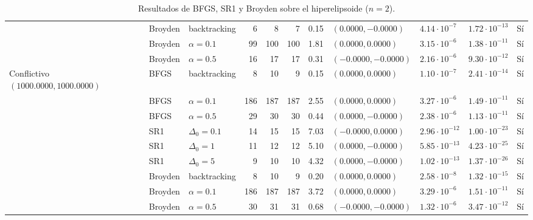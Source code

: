 \begin{table}[htbp]
{\begin{tabular}{lllrrrrlllc}
 & Broyden & backtracking & 6 & 8 & 7 & 0.15 & $(0.0000, -0.0000)$ & $4.14\cdot 10^{-7}$ & $1.72\cdot 10^{-13}$ & Sí \\
 & Broyden & $\alpha = 0.1$ & 99 & 100 & 100 & 1.81 & $(0.0000, 0.0000)$ & $3.15\cdot 10^{-6}$ & $1.38\cdot 10^{-11}$ & Sí \\
 & Broyden & $\alpha = 0.5$ & 16 & 17 & 17 & 0.31 & $(-0.0000, -0.0000)$ & $2.16\cdot 10^{-6}$ & $9.30\cdot 10^{-12}$ & Sí \\
\midrule
Conflictivo $(1000.0000, 1000.0000)$ & BFGS & backtracking & 8 & 10 & 9 & 0.15 & $(0.0000, 0.0000)$ & $1.10\cdot 10^{-7}$ & $2.41\cdot 10^{-14}$ & Sí \\
 & BFGS & $\alpha = 0.1$ & 186 & 187 & 187 & 2.55 & $(0.0000, 0.0000)$ & $3.27\cdot 10^{-6}$ & $1.49\cdot 10^{-11}$ & Sí \\
 & BFGS & $\alpha = 0.5$ & 29 & 30 & 30 & 0.44 & $(0.0000, -0.0000)$ & $2.38\cdot 10^{-6}$ & $1.13\cdot 10^{-11}$ & Sí \\
 & SR1 & $\Delta_0 = 0.1$ & 14 & 15 & 15 & 7.03 & $(-0.0000, 0.0000)$ & $2.96\cdot 10^{-12}$ & $1.00\cdot 10^{-23}$ & Sí \\
 & SR1 & $\Delta_0 = 1$ & 11 & 12 & 12 & 5.10 & $(0.0000, -0.0000)$ & $5.85\cdot 10^{-13}$ & $4.23\cdot 10^{-25}$ & Sí \\
 & SR1 & $\Delta_0 = 5$ & 9 & 10 & 10 & 4.32 & $(0.0000, -0.0000)$ & $1.02\cdot 10^{-13}$ & $1.37\cdot 10^{-26}$ & Sí \\
 & Broyden & backtracking & 8 & 10 & 9 & 0.20 & $(0.0000, 0.0000)$ & $2.58\cdot 10^{-8}$ & $1.32\cdot 10^{-15}$ & Sí \\
 & Broyden & $\alpha = 0.1$ & 186 & 187 & 187 & 3.72 & $(0.0000, 0.0000)$ & $3.29\cdot 10^{-6}$ & $1.51\cdot 10^{-11}$ & Sí \\
 & Broyden & $\alpha = 0.5$ & 30 & 31 & 31 & 0.68 & $(-0.0000, -0.0000)$ & $1.32\cdot 10^{-6}$ & $3.47\cdot 10^{-12}$ & Sí \\
\bottomrule
\end{tabular}}
\caption{Resultados de BFGS, SR1 y Broyden sobre el hiperelipsoide ($n = 2$).}
\label{tab:f3}
\end{table}